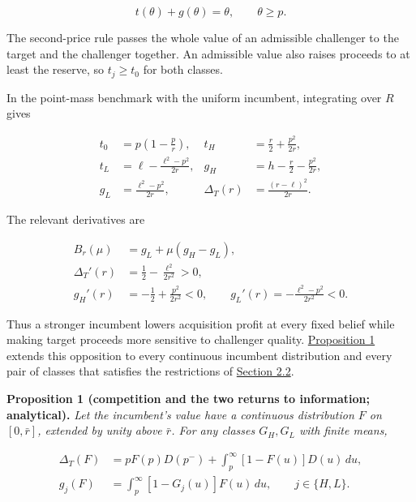 \[
t(\theta)+g(\theta)=\theta,\qquad \theta\ge p.
\]

The second-price rule passes the whole value of an admissible
challenger to the target and the challenger together. An admissible
value also raises proceeds to at least the reserve, so \(t_j\ge t_0\)
for both classes.

In the point-mass benchmark with the uniform incumbent, integrating over
\(R\) gives

\[
\begin{aligned}
t_0&=p\left(1-\frac p r\right),&
t_H&=\frac r2+\frac{p^2}{2r},\\
t_L&=\ell-\frac{\ell^2-p^2}{2r},&
g_H&=h-\frac r2-\frac{p^2}{2r},\\
g_L&=\frac{\ell^2-p^2}{2r},&
\Delta_T(r)&=\frac{(r-\ell)^2}{2r}.
\end{aligned}
\tag{4}\label{eq:paper-4}
\]

The relevant derivatives are

\[
\begin{aligned}
B_r(\mu)&=g_L+\mu(g_H-g_L),\\
\Delta_T'(r)&=\frac12-\frac{\ell^2}{2r^2}>0,\\
g_H'(r)&=-\frac12+\frac{p^2}{2r^2}<0,
\qquad g_L'(r)=-\frac{\ell^2-p^2}{2r^2}<0.
\end{aligned}
\tag{5}\label{eq:paper-5}
\]

Thus a stronger incumbent lowers acquisition profit at every fixed
belief while making target proceeds more sensitive to challenger
quality. \hyperref[result-proposition-1]{Proposition 1} extends this
opposition to every continuous incumbent distribution and every pair of
classes that satisfies the restrictions of
\hyperref[sec-values-preparation-and-the-sale]{Section 2.2}.


\protect{}\label{result-proposition-1}{\textbf{Proposition
1 (competition and the two returns to information; analytical).}}
\emph{Let the incumbent's value have a continuous distribution \(F\) on
\([0,\bar r]\), extended by unity above \(\bar r\). For any classes
\(G_H,G_L\) with finite means,}

\[
\begin{aligned}
\Delta_T(F)&=pF(p)D(p^-)+\int_p^\infty[1-F(u)]D(u)\,du,\\
g_j(F)&=\int_p^\infty[1-G_j(u)]F(u)\,du,\qquad j\in\{H,L\}.
\end{aligned}
\tag{6}\label{eq:paper-6}
\]


